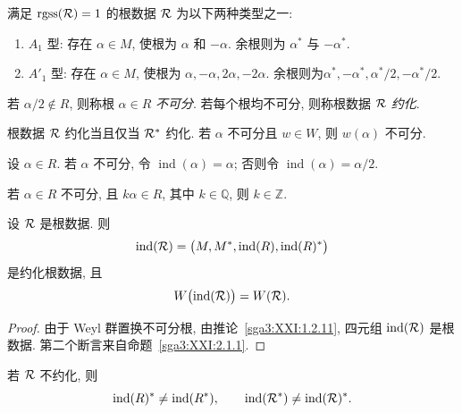 \begin{application}\label{sga3:XXI:2.1.2}
满足 \(\operatorname{rgss}(\mathcal{R})=1\) 的根数据 \(\mathcal{R}\) 为以下两种类型之一:
\begin{enumerate}
\item[\SGAInlineRefTarget{sga3:XXI:2.1.1:item:i:02}(i)] \(A_1\) 型: 存在 \(\alpha\in M\), 使根为 \(\alpha\) 和 \(-\alpha\). 余根则为 \(\alpha^\ast\) 与 \(-\alpha^\ast\).
\item[\SGAInlineRefTarget{sga3:XXI:2.1.1:item:ii:02}(ii)] \(A'_1\) 型: 存在 \(\alpha\in M\), 使根为 \(\alpha,-\alpha,2\alpha,-2\alpha\). 余根则为\linebreak \(\alpha^\ast,-\alpha^\ast,\alpha^\ast/2,-\alpha^\ast/2\).
\end{enumerate}
\end{application}

\begin{definition}\label{sga3:XXI:2.1.3}
若 \(\alpha/2\notin R\), 则称根 \(\alpha\in R\) \emph{不可分}. 若每个根均不可分, 则称根数据 \(\mathcal{R}\) \emph{约化}.
\end{definition}

根数据 \(\mathcal{R}\) 约化当且仅当 \(\mathcal{R}^\ast\) 约化. 若 \(\alpha\) 不可分且 \(w\in W\), 则 \(w(\alpha)\) 不可分.

\begin{definition}\label{sga3:XXI:2.1.4}
设 \(\alpha\in R\). 若 \(\alpha\) 不可分, 令 \(\operatorname{ind}(\alpha)=\alpha\); 否则令 \(\operatorname{ind}(\alpha)=\alpha/2\).
\end{definition}

\begin{corollary}\label{sga3:XXI:2.1.5}
若 \(\alpha\in R\) 不可分, 且 \(k\alpha\in R\), 其中 \(k\in\mathbb Q\), 则 \(k\in\mathbb Z\).
\end{corollary}

\begin{proposition}\label{sga3:XXI:2.1.6}
设 \(\mathcal{R}\) 是根数据. 则
\[
 \operatorname{ind}(\mathcal{R})
 =\bigl(M,M^\ast,\operatorname{ind}(R),
         \operatorname{ind}(R)^\ast\bigr)
\]
是约化根数据, 且
\[
 W\bigl(\operatorname{ind}(\mathcal{R})\bigr)=W(\mathcal{R}).
\]
\end{proposition}
\begin{proof}
由于 Weyl 群置换不可分根, 由推论~\ref{sga3:XXI:1.2.11}, 四元组 \(\operatorname{ind}(\mathcal{R})\) 是根数据. 第二个断言来自命题~\ref{sga3:XXI:2.1.1}.
\end{proof}

\begin{remark}\label{sga3:XXI:2.1.7}
若 \(\mathcal{R}\) 不约化, 则
\[
 \operatorname{ind}(R)^\ast\neq\operatorname{ind}(R^\ast),
 \qquad
 \operatorname{ind}(\mathcal{R}^\ast)\neq\operatorname{ind}(\mathcal{R})^\ast.
\]
\end{remark}

